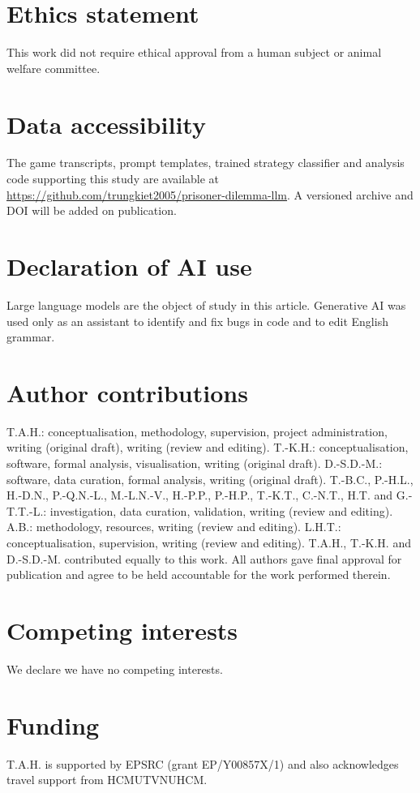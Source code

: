 \documentclass[11pt,a4paper]{article}
\begin{document}



\section*{Ethics statement}
This work did not require ethical approval from a human subject or animal welfare committee.

\section*{Data accessibility}
The game transcripts, prompt templates, trained strategy classifier and analysis code supporting this study are available at
\url{https://github.com/trungkiet2005/prisoner-dilemma-llm}. A versioned archive and DOI will be added on publication.

\section*{Declaration of AI use}
Large language models are the object of study in this article. Generative AI was used only as an assistant to identify and fix bugs in code and to edit English grammar.

\section*{Author contributions}
T.A.H.: conceptualisation, methodology, supervision, project administration, writing (original draft), writing (review and editing).
T.-K.H.: conceptualisation, software, formal analysis, visualisation, writing (original draft).
D.-S.D.-M.: software, data curation, formal analysis, writing (original draft).
T.-B.C., P.-H.L., H.-D.N., P.-Q.N.-L., M.-L.N.-V., H.-P.P., P.-H.P., T.-K.T., C.-N.T., H.T. and G.-T.T.-L.: investigation, data curation, validation, writing (review and editing).
A.B.: methodology, resources, writing (review and editing).
L.H.T.: conceptualisation,  supervision,  writing (review and editing).
T.A.H., T.-K.H. and D.-S.D.-M. contributed equally to this work.
All authors gave final approval for publication and agree to be held accountable for the work performed therein.

\section*{Competing interests}
We declare we have no competing interests.

\section*{Funding}
T.A.H. is supported by EPSRC (grant EP/Y00857X/1) and also acknowledges travel support from HCMUT\text{-}VNUHCM.



\end{document}
